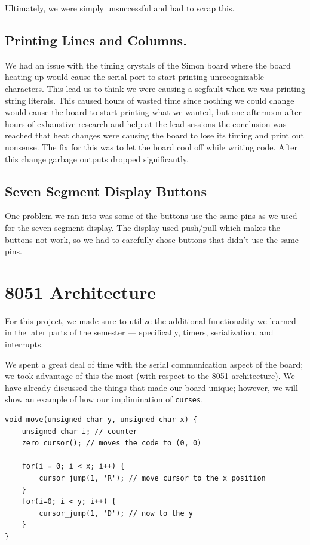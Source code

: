 \documentclass[12pt]{article}
\newcommand{\shellcmd}[1]{\texttt{\colorbox{gray!30}{#1}}}
\begin{document}
Ultimately, we were simply unsuccessful and had to scrap this.

\subsection{Printing Lines and Columns.}
We had an issue with the timing crystals of the Simon board where the board heating up would cause the serial port to start printing unrecognizable characters. This lead us to think we were causing a segfault when we was printing string literals. This caused hours of wasted time since nothing we could change would cause the board to start printing what we wanted, but one afternoon after hours of exhaustive research and help at the lead sessions the conclusion was reached that heat changes were causing the board to lose its timing and print out nonsense. The fix for this was to let the board cool off while writing code. After this change garbage outputs dropped significantly.

\subsection{Seven Segment Display Buttons}
One problem we ran into was some of the buttons use the same pins as we used for the seven segment display. The display used push/pull which makes the buttons not work, so we had to carefully chose buttons that didn't use the same pins.

\section{8051 Architecture}
For this project, we made sure to utilize the additional functionality we learned in the later parts of the semester --- specifically, timers, serialization, and interrupts.

We spent a great deal of time with the serial communication aspect of the board; we took advantage of this the most (with respect to the \num{8051} architecture). We have already discussed the things that made our board unique; however, we will show an example of how our implimination of \shellcmd{curses}.

\begin{lstlisting}[style=cC]
void move(unsigned char y, unsigned char x) {
	unsigned char i; // counter
	zero_cursor(); // moves the code to (0, 0)

	for(i = 0; i < x; i++) {
		cursor_jump(1, 'R'); // move cursor to the x position
	}
	for(i=0; i < y; i++) {
		cursor_jump(1, 'D'); // now to the y
	}
}
\end{lstlisting}
\end{document}
